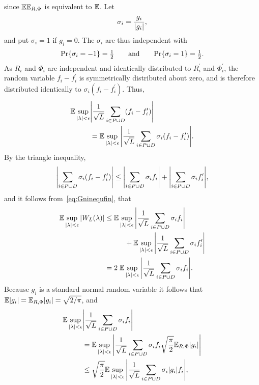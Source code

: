\documentclass[journal]{IEEEtran}
\begin{document}
\begin{IEEEproof}
since ${\mathbb E} {\mathbb E}_{R,\Phi}$ is equivalent to ${\mathbb E}$.   Let
\[
\sigma_i = \frac{g_i}{{\left\vert g_i \right\vert}},
\]
and put $\sigma_i = 1$ if $g_i = 0$.  The $\sigma_i$ are thus independent with 
\[
{\operatorname{Pr}}\{ \sigma_i = -1 \} = \tfrac{1}{2} \qquad \text{and} \qquad  {\operatorname{Pr}}\{ \sigma_i = 1 \} = \tfrac{1}{2}.
\]  
As $R_i$ and $\Phi_i$ are independent and identically distributed to $R_i^\prime$ and $\Phi_i^\prime$, the random variable $f_{i} - f_{i}^\prime$ is symmetrically distributed about zero, and is therefore distributed identically to $\sigma_i( f_{i} - f_{i}^\prime)$.  Thus,
\begin{align*}
 {\mathbb E} \sup_{{\vert \lambda \vert} < \epsilon}  &{\left\vert   \frac{1}{\sqrt{L}}\sum_{i \in P \cup D}  (f_{i} - f_{i}^\prime)  \right\vert} \\
&= {\mathbb E} \sup_{{\vert \lambda \vert} < \epsilon}  {\left\vert   \frac{1}{\sqrt{L}}\sum_{i \in P \cup D} \sigma_i ( f_{i} - f_{i}^\prime)  \right\vert}.
\end{align*}
By the triangle inequality,
\[
{\left\vert  \sum_{i\in P \cup D} \sigma_i (f_{i} - f_{i}^\prime) \right\vert} \leq {\left\vert  \sum_{i \in P \cup D} \sigma_i f_{i}  \right\vert} + {\left\vert  \sum_{i\in P \cup D}  \sigma_i f_{i}^\prime  \right\vert},
\]
and it follows from~\eqref{eq:Gninequfin}, that
\begin{align*}
 {\mathbb E} \sup_{{\vert \lambda \vert} < \epsilon} {\left\vert  W_L(\lambda) \right\vert} &\leq {\mathbb E} \sup_{{\vert \lambda \vert} < \epsilon}  {\left\vert  \frac{1}{\sqrt{L}}\sum_{i\in P \cup D} \sigma_i f_{i}  \right\vert} \\
&\hspace{1cm} + {\mathbb E} \sup_{{\vert \lambda \vert} < \epsilon}  {\left\vert \frac{1}{\sqrt{L}} \sum_{i \in P \cup D}  \sigma_i  f_{i}^\prime  \right\vert} \\
&= 2 \; {\mathbb E} \sup_{{\vert \lambda \vert} < \epsilon}  {\left\vert  \frac{1}{\sqrt{L}}\sum_{i \in P \cup D} \sigma_i f_{i}  \right\vert}.
\end{align*}
Because $g_i$ is a standard normal random variable it follows that ${\mathbb E} {\left\vert g_i \right\vert} = {\mathbb E}_{R,\Phi} {\left\vert g_i \right\vert} = \sqrt{2/\pi}$, and
\begin{align*}
\expect \sup_{\sabs{\lambda} < \epsilon}  &\abs{ \frac{1}{\sqrt{L}}\sum_{i \in P \cup D} \sigma_i f_{i} } \\
&= \expect \sup_{\sabs{\lambda} < \epsilon}  \abs{ \frac{1}{\sqrt{L}}\sum_{i \in P \cup D} \sigma_i f_{i} \sqrt{\frac{\pi}{2}}\expect_{R,\Phi} \abs{g_i}} \\
&\leq \sqrt{\frac{\pi}{2}} \expect \sup_{\sabs{\lambda} < \epsilon}  \abs{ \frac{1}{ \sqrt{L}}\sum_{i \in P \cup D} \sigma_i \abs{g_i}  f_{i}},

\end{align*}
\end{IEEEproof}
\end{document}
